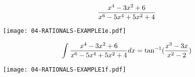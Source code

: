 %
%
%
%
%
%
%
%

\vfill\eject

$${{x^4-3x^2+6}\over{x^6-5x^4+5x^2+4}}$$

\begin{center}
\texttt{[image: 04-RATIONALS-EXAMPLE1e.pdf]}
\end{center}


$$\int {{x^4-3x^2+6}\over{x^6-5x^4+5x^2+4}} dx =
\tan^{-1}({{x^3-3x}\over{x^2-2}})$$

\begin{center}
\texttt{[image: 04-RATIONALS-EXAMPLE1f.pdf]}
\end{center}



